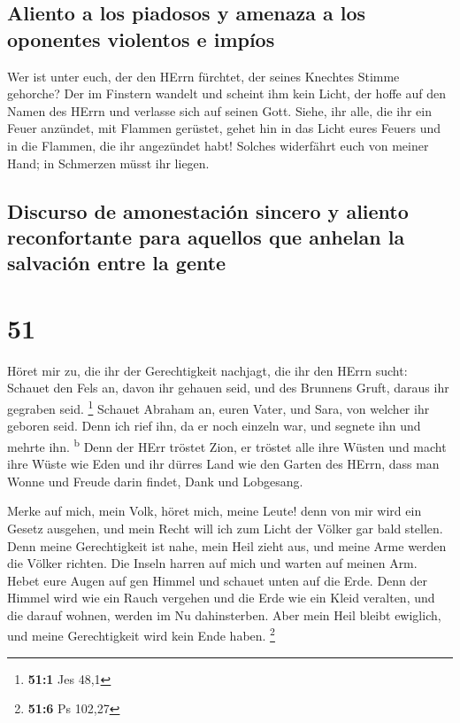 \hypertarget{aliento-a-los-piadosos-y-amenaza-a-los-oponentes-violentos-e-impuxedos}{%
\subsection{Aliento a los piadosos y amenaza a los oponentes violentos e
impíos}\label{aliento-a-los-piadosos-y-amenaza-a-los-oponentes-violentos-e-impuxedos}}

 Wer ist unter euch, der den HErrn fürchtet, der seines
Knechtes Stimme gehorche? Der im Finstern wandelt und scheint ihm kein
Licht, der hoffe auf den Namen des HErrn und verlasse sich auf seinen
Gott.  Siehe, ihr alle, die ihr ein Feuer anzündet, mit
Flammen gerüstet, gehet hin in das Licht eures Feuers und in die
Flammen, die ihr angezündet habt! Solches widerfährt euch von meiner
Hand; in Schmerzen müsst ihr liegen.

\hypertarget{discurso-de-amonestaciuxf3n-sincero-y-aliento-reconfortante-para-aquellos-que-anhelan-la-salvaciuxf3n-entre-la-gente}{%
\subsection{Discurso de amonestación sincero y aliento reconfortante
para aquellos que anhelan la salvación entre la
gente}\label{discurso-de-amonestaciuxf3n-sincero-y-aliento-reconfortante-para-aquellos-que-anhelan-la-salvaciuxf3n-entre-la-gente}}

\hypertarget{section-50}{%
\section{51}\label{section-50}}

 Höret mir zu, die ihr der Gerechtigkeit nachjagt, die ihr
den HErrn sucht: Schauet den Fels an, davon ihr gehauen seid, und des
Brunnens Gruft, daraus ihr gegraben seid. \footnote{\textbf{51:1} Jes
  48,1}  Schauet Abraham an, euren Vater, und Sara, von
welcher ihr geboren seid. Denn ich rief ihn, da er noch einzeln war, und
segnete ihn und mehrte ihn. \textsuperscript{b}  Denn der
HErr tröstet Zion, er tröstet alle ihre Wüsten und macht ihre Wüste wie
Eden und ihr dürres Land wie den Garten des HErrn, dass man Wonne und
Freude darin findet, Dank und Lobgesang.

 Merke auf mich, mein Volk, höret mich, meine Leute! denn
von mir wird ein Gesetz ausgehen, und mein Recht will ich zum Licht der
Völker gar bald stellen.  Denn meine Gerechtigkeit ist
nahe, mein Heil zieht aus, und meine Arme werden die Völker richten. Die
Inseln harren auf mich und warten auf meinen Arm.  Hebet
eure Augen auf gen Himmel und schauet unten auf die Erde. Denn der
Himmel wird wie ein Rauch vergehen und die Erde wie ein Kleid veralten,
und die darauf wohnen, werden im Nu dahinsterben. Aber mein Heil bleibt
ewiglich, und meine Gerechtigkeit wird kein Ende haben. \footnote{\textbf{51:6}
  Ps 102,27}

